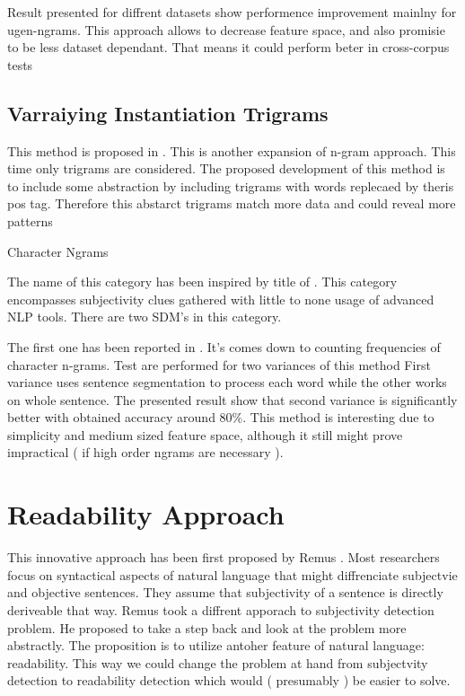 Result presented for diffrent datasets show performence improvement mainlny for ugen-ngrams. This approach allows to decrease feature space, and also
promisie to be less dataset dependant. That means it could perform  beter in cross-corpus tests

\subsection{ Varraiying Instantiation Trigrams }

This method is proposed in \cite{Murray2011}. This is another expansion of n-gram approach. This time only trigrams are considered. The proposed development 
of this method is to include some abstraction by including trigrams with words replecaed by theris pos tag. Therefore this abstarct trigrams 
match more data and could reveal more patterns

Character Ngrams

The name of this category has been inspired by title of \cite{kraaij2008}. This category encompasses subjectivity clues gathered with little to none usage
of advanced NLP tools. There are two SDM's in this category. 

The first one has been reported in \cite{kraaij2008}. It's comes down to counting frequencies of character n-grams. Test are performed for two variances of this method
First variance uses sentence segmentation to process each word while the other works on whole sentence. The presented result show that second variance is 
significantly better with obtained accuracy around 80\%. This method is interesting due to simplicity and medium sized feature space, although it still might
prove impractical ( if high order ngrams are necessary ).

\section{ Readability Approach }

This innovative approach has been first proposed by Remus \cite{remus2011}. Most researchers focus on syntactical
aspects of natural language that might diffrenciate subjectvie and objective sentences. They assume that subjectivity of a sentence is directly 
deriveable that way. Remus took a diffrent apporach to subjectivity detection problem. He proposed to take a step back and look at the problem
more abstractly. The proposition is to utilize antoher feature of natural language: readability. This way we could change the problem at hand
from subjectvity detection to readability detection which would ( presumably ) be easier to solve.

